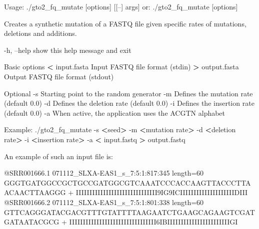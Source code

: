 \documentclass[11pt,]{krantz}
\newenvironment{Shaded}{\begin{snugshade}}{\end{snugshade}}
\newcommand{\OperatorTok}[1]{\textcolor[rgb]{0.43,0.43,0.43}{\textbf{#1}}}
\newcommand{\ExtensionTok}[1]{#1}
\newcommand{\NormalTok}[1]{#1}
\begin{document}
\begin{Shaded}
\begin{Highlighting}[]
\ExtensionTok{Usage}\NormalTok{: ./gto2_fq_mutate [options] [[--] args]}
   \ExtensionTok{or}\NormalTok{: ./gto2_fq_mutate [options]}

\ExtensionTok{Creates}\NormalTok{ a synthetic mutation of a FASTQ file given specific }
\ExtensionTok{rates}\NormalTok{ of mutations, deletions and additions.}

    \ExtensionTok{-h}\NormalTok{, --help      show this help message and exit}

\ExtensionTok{Basic}\NormalTok{ options}
    \OperatorTok{<} \ExtensionTok{input.fasta}\NormalTok{   Input FASTQ file format (stdin)}
    \OperatorTok{>} \ExtensionTok{output.fasta}\NormalTok{  Output FASTQ file format (stdout)}

\ExtensionTok{Optional}
    \ExtensionTok{-s}\NormalTok{              Starting point to the random generator}
    \ExtensionTok{-m}\NormalTok{              Defines the mutation rate (default 0.0)}
    \ExtensionTok{-d}\NormalTok{              Defines the deletion rate (default 0.0)}
    \ExtensionTok{-i}\NormalTok{              Defines the insertion rate (default 0.0)}
    \ExtensionTok{-a}\NormalTok{              When active, the application uses the }
                    \ExtensionTok{ACGTN}\NormalTok{ alphabet}

\ExtensionTok{Example}\NormalTok{: ./gto2_fq_mutate -s }\OperatorTok{<}\NormalTok{seed}\OperatorTok{>}\NormalTok{ -m }\OperatorTok{<}\NormalTok{mutation rate}\OperatorTok{>} 
\ExtensionTok{-d} \OperatorTok{<}\NormalTok{deletion rate}\OperatorTok{>}\NormalTok{ -i }\OperatorTok{<}\NormalTok{insertion rate}\OperatorTok{>}\NormalTok{ -a }
\OperatorTok{<} \ExtensionTok{input.fastq} \OperatorTok{>}\NormalTok{ output.fastq}
\end{Highlighting}
\end{Shaded}

An example of such an input file is:

\begin{Shaded}
\begin{Highlighting}[]
\ExtensionTok{@SRR001666.1}\NormalTok{ 071112_SLXA-EAS1_s_7:5:1:817:345 length=60}
\ExtensionTok{GGGTGATGGCCGCTGCCGATGGCGTCAAATCCCACCAAGTTACCCTTAACAACTTAAGGG}
\ExtensionTok{+}
\ExtensionTok{IIIIIIIIIIIIIIIIIIIIIIIIIIIIII9IG9ICIIIIIIIIIIIIIIIIIIIIDIII}
\ExtensionTok{@SRR001666.2}\NormalTok{ 071112_SLXA-EAS1_s_7:5:1:801:338 length=60}
\ExtensionTok{GTTCAGGGATACGACGTTTGTATTTTAAGAATCTGAAGCAGAAGTCGATGATAATACGCG}
\ExtensionTok{+}
\ExtensionTok{IIIIIIIIIIIIIIIIIIIIIIIIIIIIIIII6IBIIIIIIIIIIIIIIIIIIIIIIIGI}
\end{Highlighting}
\end{Shaded}
\end{document}
